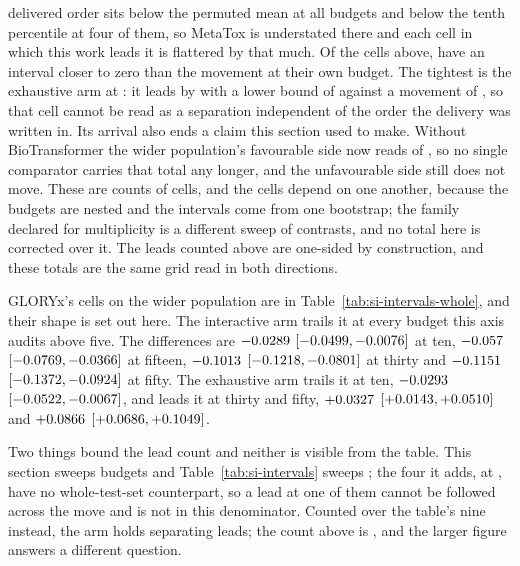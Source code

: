 \documentclass[journal=jcisd8,manuscript=suppinfo,layout=onecolumn]{achemso}
\begin{document}
delivered order sits below the permuted mean at all \numPopdefTiebreakwiderbudgetsWord{} budgets
and below the tenth percentile at four of them, so MetaTox is understated there and each cell in
which this work leads it is flattered by that much. Of the cells above,
\numPopdefTiebreakcellsinreachWord{} have an interval closer to zero than the movement at their own
budget. The tightest is the
exhaustive arm at \numPopdefTiebreakworstbudget{}: it leads by
\numPopdefTiebreakworstmargin{} with a lower bound of \numPopdefTiebreakworstcilo{} against a
movement of \numPopdefTiebreakworstshift{}, so that cell cannot be read as a separation independent
of the order the delivery was written in. Its arrival also ends a claim this section used to make. Without
BioTransformer the wider population's favourable side now reads \numPopdefWithoutbtforwholeWord{}
of \numPopdefForthisworkwholeWord{}, so no single comparator carries that total any longer, and the
unfavourable side still does not move. These are counts of cells, and the cells depend on one
another, because the budgets are nested and the intervals come from one bootstrap; the family
declared for multiplicity is a different sweep of \numHolmTests{} contrasts, and no total here is
corrected over it. The \numPopdefLeadstotalWord{} leads counted above are one-sided by
construction, and these totals are the same grid read in both directions.

GLORYx's cells on the wider population are in Table~\ref{tab:si-intervals-whole}, and their shape is set out here.
The interactive arm trails it at every budget this axis audits above five. The differences are
$-0.0289$ $[-0.0499,
-0.0076]$ at ten, $-0.057$
$[-0.0769, -0.0366]$ at fifteen,
$-0.1013$ $[-0.1218,
-0.0801]$ at thirty and $-0.1151$
$[-0.1372, -0.0924]$ at fifty. The exhaustive arm
trails it at ten, $-0.0293$ $[-0.0522,
-0.0067]$, and leads it at thirty and fifty,
$+0.0327$ $[+0.0143,
+0.0510]$ and $+0.0866$
$[+0.0686, +0.1049]$.

Two things bound the lead count and neither is visible from the table. This section sweeps
\numSTwoNineBudgets{} budgets and Table~\ref{tab:si-intervals} sweeps
\numSTwoNineTablebudgets{}; the four it adds, at \numSTwoNineBudgetsunaudited{}, have no
whole-test-set counterpart, so a lead at one of them cannot be followed across the move and is not
in this denominator. Counted over the table's nine instead, the arm holds \numSTwoNineLeads{}
separating leads; the count above is \numPopdefLeadstotal{}, and the larger figure answers a
different question.
\end{document}
